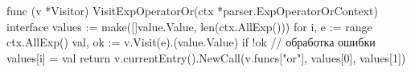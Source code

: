 func (v *Visitor) VisitExpOperatorOr(ctx *parser.ExpOperatorOrContext) interface{} {
	values := make([]value.Value, len(ctx.AllExp()))
	for i, e := range ctx.AllExp() {
		val, ok := v.Visit(e).(value.Value)
		if !ok { // обработка ошибки }
		values[i] = val
	}
	return v.currentEntry().NewCall(v.funcs["or"], values[0], values[1])
}